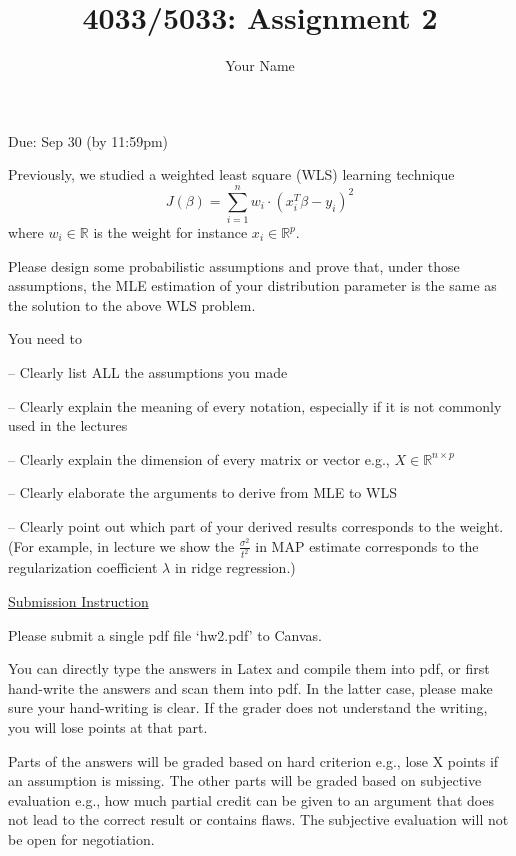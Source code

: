 \documentclass{llncs}
\title{4033/5033: Assignment 2}
\author{Your Name}
\institute{}
\begin{document}
\maketitle 

\setlength\parindent{0pt} 
\setlength{\parskip}{10pt}

Due: Sep 30 (by 11:59pm)

Previously, we studied a weighted 
least square (WLS) learning technique 
\begin{equation}
J(\beta) = {\sum}_{i=1}^{n} w_{i} 
\cdot (x_{i}^{T}\beta - y_{i})^2
\end{equation}
where $w_{i} \in \mathbb{R}$ is the weight for instance $x_{i} \in \mathbb{R}^{p}$. 


Please design some probabilistic assumptions 
and prove that, under those assumptions, the 
MLE estimation of your distribution parameter 
is the same as the solution to the above WLS problem. 

You need to 

-- Clearly list ALL the assumptions you made 

-- Clearly explain the meaning of every notation, 
especially if it is not commonly used in the lectures

-- Clearly explain the dimension of every 
matrix or vector e.g., $X \in \mathbb{R}^{n 
\times p}$  

-- Clearly elaborate the arguments to derive 
from MLE to WLS

-- Clearly point out which part of your derived 
results corresponds to the weight. (For example, 
in lecture we show the $\frac{\sigma^2}{t^2}$ 
in MAP estimate  corresponds to the regularization 
coefficient $\lambda$ in ridge regression.)  

\vfill

\underline{Submission Instruction}

Please submit a single pdf file `hw2.pdf' to Canvas. 

You can directly type the answers in Latex and compile 
them into pdf, or first hand-write the answers and 
scan them into pdf. In the latter case, please make 
sure your hand-writing is clear. If the grader does 
not understand the writing, you will lose points at 
that part. 

Parts of the answers will be graded based on hard criterion e.g., lose X points if an assumption is missing. The other parts will be graded based on subjective evaluation e.g., how much partial credit can be given to an argument that does not lead to the correct result or contains flaws. The subjective evaluation will not be open for negotiation. 
\end{document}
